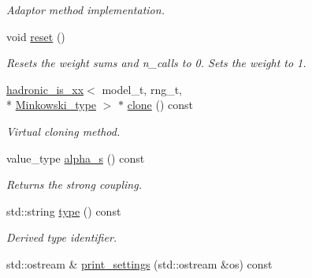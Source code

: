 \begin{DoxyCompactItemize}
\begin{DoxyCompactList}\small\item\em Adaptor method implementation. \end{DoxyCompactList}\item 
\hypertarget{a00257_ac4a595e2cdbea918c39193f46b87fb25}{void \hyperlink{a00257_ac4a595e2cdbea918c39193f46b87fb25}{reset} ()}\label{a00257_ac4a595e2cdbea918c39193f46b87fb25}

\begin{DoxyCompactList}\small\item\em Resets the weight sums and n\-\_\-calls to 0. Sets the weight to 1. \end{DoxyCompactList}\item 
\hypertarget{a00257_a3acbcfeec5ac28ec4ffbbf6c7aebfa69}{\hyperlink{a00256}{hadronic\-\_\-is\-\_\-xx}$<$ model\-\_\-t, rng\-\_\-t, \\*
\hyperlink{a00369}{Minkowski\-\_\-type} $>$ $\ast$ \hyperlink{a00257_a3acbcfeec5ac28ec4ffbbf6c7aebfa69}{clone} () const }\label{a00257_a3acbcfeec5ac28ec4ffbbf6c7aebfa69}

\begin{DoxyCompactList}\small\item\em Virtual cloning method. \end{DoxyCompactList}\item 
\hypertarget{a00257_a4f937cd0321590bffdc1fee47f011fbb}{value\-\_\-type \hyperlink{a00257_a4f937cd0321590bffdc1fee47f011fbb}{alpha\-\_\-s} () const }\label{a00257_a4f937cd0321590bffdc1fee47f011fbb}

\begin{DoxyCompactList}\small\item\em Returns the strong coupling. \end{DoxyCompactList}\item 
\hypertarget{a00257_a500b5a0a7febf4c0b500c1793e9993ae}{std\-::string \hyperlink{a00257_a500b5a0a7febf4c0b500c1793e9993ae}{type} () const }\label{a00257_a500b5a0a7febf4c0b500c1793e9993ae}

\begin{DoxyCompactList}\small\item\em Derived type identifier. \end{DoxyCompactList}\item 
\hypertarget{a00257_ae4d7ac1b77a4ccfa09c10ca286d0d7b2}{std\-::ostream \& \hyperlink{a00257_ae4d7ac1b77a4ccfa09c10ca286d0d7b2}{print\-\_\-settings} (std\-::ostream \&os) const }\label{a00257_ae4d7ac1b77a4ccfa09c10ca286d0d7b2}


\end{DoxyCompactItemize}
